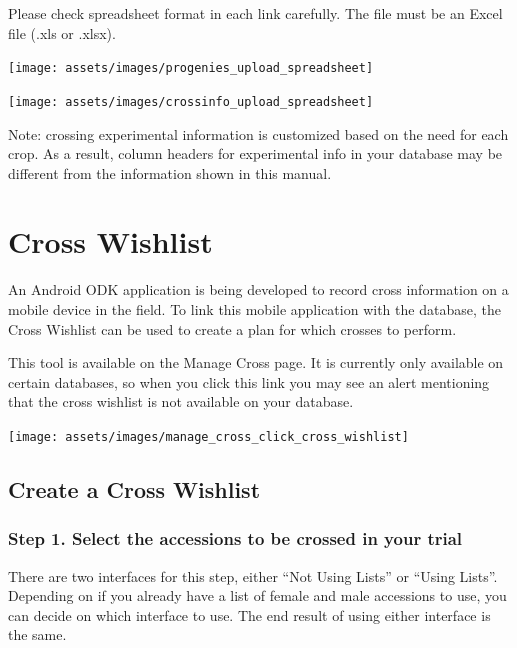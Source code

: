 \documentclass[
  12pt,
]{book}
\begin{document}
Please check spreadsheet format in each link carefully. The file must be an Excel file (.xls or .xlsx).

\begin{center}\texttt{[image: assets/images/progenies\_upload\_spreadsheet]} \end{center}

\begin{center}\texttt{[image: assets/images/crossinfo\_upload\_spreadsheet]} \end{center}

Note: crossing experimental information is customized based on the need for each crop. As a result, column headers for experimental info in your database may be different from the information shown in this manual.

\hypertarget{cross-wishlist}{%
\section{Cross Wishlist}\label{cross-wishlist}}

An Android ODK application is being developed to record cross information on a mobile device in the field. To link this mobile application with the database, the Cross Wishlist can be used to create a plan for which crosses to perform.

This tool is available on the Manage Cross page. It is currently only available on certain databases, so when you click this link you may see an alert mentioning that the cross wishlist is not available on your database.

\begin{center}\texttt{[image: assets/images/manage\_cross\_click\_cross\_wishlist]} \end{center}

\hypertarget{create-a-cross-wishlist}{%
\subsection{Create a Cross Wishlist}\label{create-a-cross-wishlist}}

\hypertarget{step-1.-select-the-accessions-to-be-crossed-in-your-trial}{%
\subsubsection*{Step 1. Select the accessions to be crossed in your trial}\label{step-1.-select-the-accessions-to-be-crossed-in-your-trial}}


There are two interfaces for this step, either ``Not Using Lists'' or ``Using Lists''. Depending on if you already have a list of female and male accessions to use, you can decide on which interface to use. The end result of using either interface is the same.
\end{document}
